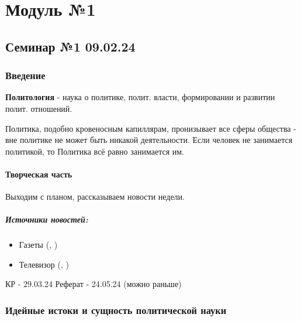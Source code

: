 \part{Модуль №1}

\chapter{Семинар №1 09.02.24}

\section{Введение}

\textbf{Политология} - наука о политике, полит. власти, формировании и развитии полит. отношений.

Политика, подобно кровеносным капиллярам, пронизывает все сферы общества - вне политике не может быть никакой деятельности.
Если человек не занимается политикой, то Политика всё равно занимается им.

\subsection*{Творческая часть}
Выходим с планом, рассказываем новости недели.

\subsubsection{Источники новостей:}
\begin{itemize}
    \item Газеты (, )
    \item Телевизор (, )
\end{itemize}

КР - 29.03.24
Реферат - 24.05.24 (можно раньше)

\section{Идейные истоки и сущность политической науки}

